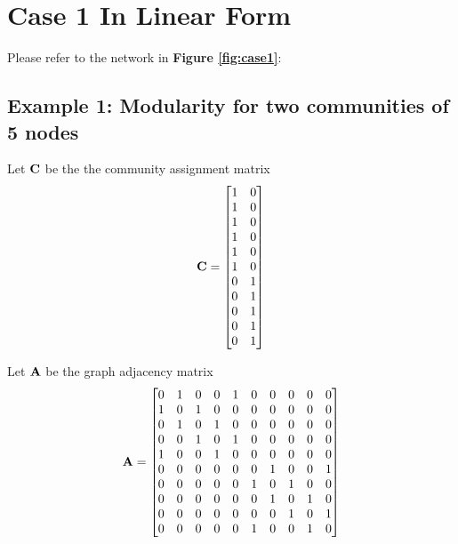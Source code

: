 \documentclass[a4paper,12pt]{article}
\begin{document}
	
	
	
	
	
	
	
	
	
	
	
	
	
	
	
	
	
	
	
	
	
	
	
	
	
	
	
	
	
	
	\newpage
	\appendix
	
	\section*{Case 1 In Linear Form}
	Please refer to the network in \textbf{Figure \ref{fig:case1}}:
	
	\subsection*{Example 1: Modularity for two communities of 5 nodes}
	Let $\bf{C}$ be the the community assignment matrix 
	\[ {\bf C} = \begin{bmatrix}1 & 0 \\ 1 & 0 \\ 1 & 0 \\ 1 & 0 \\ 1 & 0 \\ 1 & 0 \\ 0 & 1 \\ 0 & 1 \\ 0 & 1 \\ 0 & 1 \\ 0 & 1 \\
	\end{bmatrix}\] 
	
	Let $\bf A$ be the graph adjacency matrix
	\[ {\bf A} = \begin{bmatrix}
		0& 1& 0& 0& 1& 0& 0& 0& 0& 0\\
		1& 0& 1& 0& 0& 0& 0& 0& 0& 0\\
		0& 1& 0& 1& 0& 0& 0& 0& 0& 0\\
		0& 0& 1& 0& 1& 0& 0& 0& 0& 0\\
		1& 0& 0& 1& 0& 0& 0& 0& 0& 0\\
		0& 0& 0& 0& 0& 0& 1& 0& 0& 1\\
		0& 0& 0& 0& 0& 1& 0& 1& 0& 0\\
		0& 0& 0& 0& 0& 0& 1& 0& 1& 0\\
		0& 0& 0& 0& 0& 0& 0& 1& 0& 1\\
		0& 0& 0& 0& 0& 1& 0& 0& 1& 0
	\end{bmatrix}\] 
	
\end{document}
